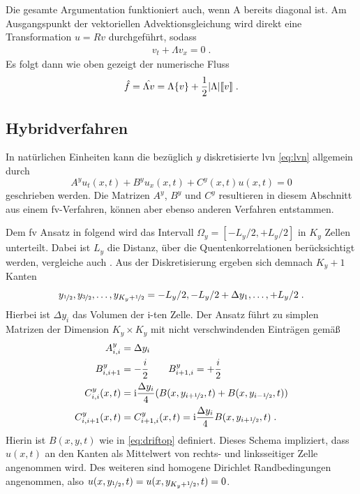Die gesamte Argumentation funktioniert auch, wenn A bereits diagonal ist. Am Ausgangspunkt der vektoriellen Advektionsgleichung wird direkt eine Transformation $u=Rv$ durchgeführt, sodass
\begin{align*}
  v_t + \Lambda v_x = 0 \; .
\end{align*}
Es folgt dann wie oben gezeigt der numerische Fluss
\begin{align}
  \hat{f} = \hat{\Lambda v} = \Lambda\{ v \} + \frac{1}{2}|\Lambda|\llbracket v \rrbracket \; .
  \label{eq:FLUX}
\end{align}


\subsection{Hybridverfahren}\label{sec:Hybridverfahren}
In natürlichen Einheiten kann die bezüglich $y$ diskretisierte \ac{lvn} \eqref{eq:lvn} allgemein durch
\begin{equation}
  {A}^y u_t(x,t) + {B}^y u_x(x,t) + {C}^y(x,t)u(x,t) = 0
  \label{eq:qschema}
\end{equation}
geschrieben werden. Die Matrizen  ${A}^y$, ${B}^y$ und ${C}^y$ resultieren in diesem Abschnitt aus einem \ac{fv}-Verfahren, können aber ebenso anderen Verfahren entstammen.

Dem \ac{fv} Ansatz in \cite{lukas1} folgend wird das Intervall ${\Omega_y = [-L_y/2,+L_y/2]}$ in $K_y$ Zellen unterteilt. Dabei ist $L_y$ die Distanz, über die Quentenkorrelationen berücksichtigt werden, vergleiche auch \cite{frensley2}. Aus der Diskretisierung  ergeben sich demnach $K_y+1$ Kanten
\begin{equation*}
  {y_{\nicefrac{1}{2}}, y_{\nicefrac{3}{2}}, \dots, y_{K_y + \nicefrac{1}{2}} = -L_y/2, -L_y/2+\Delta y_1,\dots,+L_y/2} \; .
\end{equation*}
Hierbei ist $\Delta y_i$ das Volumen der i-ten Zelle. Der Ansatz führt zu simplen Matrizen der Dimension ${K_y\times K_y}$ mit nicht verschwindenden Einträgen gemäß
\begin{equation}
  \begin{aligned}
  {A}^y_{i,i} &= \Delta y_i \\
  {B}^y_{i,i+1} &= -\frac{i}{2} \qquad
  {B}^y_{i+1, i} = +\frac{i}{2}  \\
  {C}^y_{i,i}(x,t) &= \mathrm{i} \frac{\Delta y_i}{4} (B(x, y_{i+\nicefrac{1}{2}},t) + B(x, y_{i-\nicefrac{1}{2}},t))  \\
  {C}^y_{i,i+1}(x,t) &= C^y_{i+1,i}(x,t) = \mathrm{i} \frac{\Delta y_i}{4} B(x, y_{i+\nicefrac{1}{2}},t)  \; .
  \end{aligned}
  \label{eq:ABC}
\end{equation}
Hierin ist $B(x,y,t)$ wie in \eqref{eq:driftop} definiert. Dieses Schema impliziert, dass $u(x,t)$ an den Kanten als Mittelwert von rechts- und linksseitiger Zelle angenommen wird. Des weiteren sind  homogene Dirichlet Randbedingungen angenommen, also ${u(x,y_{\nicefrac{1}{2}}, t) = u(x,y_{K_y+\nicefrac{1}{2}}, t) = 0}$.

